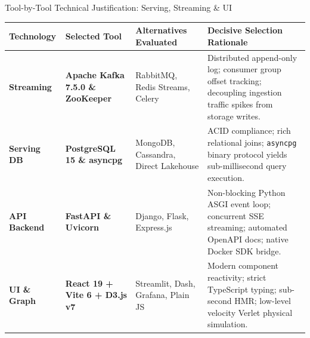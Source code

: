\documentclass[aspectratio=169, 10pt]{beamer}
\begin{document}
\begin{frame}{Tool-by-Tool Technical Justification: Serving, Streaming \& UI}
  \begin{table}
    \centering
    \scriptsize
    \begin{tabularx}{\textwidth}{l p{3.2cm} p{3.5cm} X}
      \toprule
      \textbf{Technology} & \textbf{Selected Tool} & \textbf{Alternatives Evaluated} & \textbf{Decisive Selection Rationale} \\
      \midrule
      \textbf{Streaming} & \textbf{Apache Kafka 7.5.0 \& ZooKeeper} & RabbitMQ, Redis Streams, Celery & Distributed append-only log; consumer group offset tracking; decoupling ingestion traffic spikes from storage writes. \\
      \addlinespace
      \textbf{Serving DB} & \textbf{PostgreSQL 15 \& asyncpg} & MongoDB, Cassandra, Direct Lakehouse & ACID compliance; rich relational joins; \texttt{asyncpg} binary protocol yields sub-millisecond query execution. \\
      \addlinespace
      \textbf{API Backend} & \textbf{FastAPI \& Uvicorn} & Django, Flask, Express.js & Non-blocking Python ASGI event loop; concurrent SSE streaming; automated OpenAPI docs; native Docker SDK bridge. \\
      \addlinespace
      \textbf{UI \& Graph} & \textbf{React 19 + Vite 6 + D3.js v7} & Streamlit, Dash, Grafana, Plain JS & Modern component reactivity; strict TypeScript typing; sub-second HMR; low-level velocity Verlet physical simulation. \\
      \bottomrule
    \end{tabularx}
  \end{table}
\end{frame}
\end{document}
